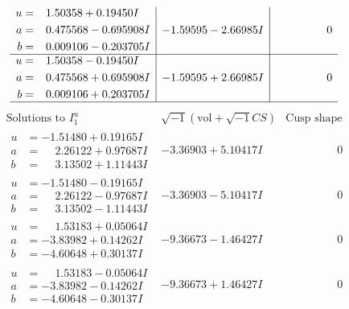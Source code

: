 \documentclass[1p]{elsarticle_modified}
\theoremstyle{definition}
\newcommand{\I}{\sqrt{-1}}
\begin{document}
$$\begin{array}{c|c|c}
\begin{aligned}
u &= \phantom{-}1.50358 + 0.19450 I \\
a &= \phantom{-}0.475568 - 0.695908 I \\
b &= \phantom{-}0.009106 - 0.203705 I\end{aligned}
 & -1.59595 - 2.66985 I & \phantom{-0.000000 } 0 \\ \hline\begin{aligned}
u &= \phantom{-}1.50358 - 0.19450 I \\
a &= \phantom{-}0.475568 + 0.695908 I \\
b &= \phantom{-}0.009106 + 0.203705 I\end{aligned}
 & -1.59595 + 2.66985 I & \phantom{-0.000000 } 0\\
 \hline 
 \end{array}$$\newpage$$\begin{array}{c|c|c}  
\text{Solutions to }I^u_{1}& \I (\text{vol} + \sqrt{-1}CS) & \text{Cusp shape}\\
 \hline 
\begin{aligned}
u &= -1.51480 + 0.19165 I \\
a &= \phantom{-}2.26122 + 0.97687 I \\
b &= \phantom{-}3.13502 + 1.11443 I\end{aligned}
 & -3.36903 + 5.10417 I & \phantom{-0.000000 } 0 \\ \hline\begin{aligned}
u &= -1.51480 - 0.19165 I \\
a &= \phantom{-}2.26122 - 0.97687 I \\
b &= \phantom{-}3.13502 - 1.11443 I\end{aligned}
 & -3.36903 - 5.10417 I & \phantom{-0.000000 } 0 \\ \hline\begin{aligned}
u &= \phantom{-}1.53183 + 0.05064 I \\
a &= -3.83982 + 0.14262 I \\
b &= -4.60648 + 0.30137 I\end{aligned}
 & -9.36673 - 1.46427 I & \phantom{-0.000000 } 0 \\ \hline\begin{aligned}
u &= \phantom{-}1.53183 - 0.05064 I \\
a &= -3.83982 - 0.14262 I \\
b &= -4.60648 - 0.30137 I\end{aligned}
 & -9.36673 + 1.46427 I & \phantom{-0.000000 } 0 \\ \hline\begin{aligned}

\end{aligned}
\end{array}$$
\end{document}
